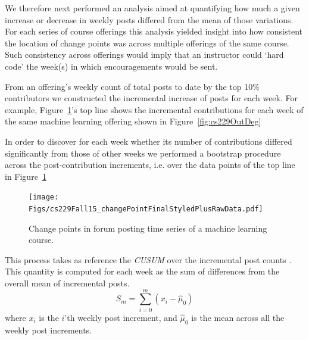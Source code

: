 We therefore next performed an analysis aimed at quantifying how much
a given increase or decrease in weekly posts differed from the mean of
those variations. For each series of course offerings this analysis
yielded insight into how consistent the location of change points was
across multiple offerings of the same course. Such consistency across
offerings would imply that an instructor could `hard code' the week(s)
in which encouragements would be sent.

From an offering's weekly count of total posts to date by the top 10\%
contributors we constructed the incremental increase of posts for each
week. For example, Figure~\ref{fig:cs229ChangePts}'s top line shows
the incremental contributions for each week of the same machine
learning offering shown in Figure~\ref{fig:cs229OutDeg}

In order to discover for each week whether its number of contributions
differed significantly from those of other weeks we performed a
bootstrap procedure across the post-contribution increments, i.e. over
the data points of the top line in Figure~\ref{fig:cs229ChangePts}
\cite{tayl16}
\begin{figure}[htp]
       \centering
       \texttt{[image: Figs/cs229Fall15\_changePointFinalStyledPlusRawData.pdf]}
       \caption{\textnormal{Change points in forum posting 
           time series of a machine learning course.}}
       \label{fig:cs229ChangePts}
\end{figure}
This process takes as reference the {\em CUSUM} over the incremental
post counts \cite{nist2012}. This quantity is computed for each week
as the sum of differences from the overall mean of incremental posts.
\begin{equation}
S_m = \sum_{i=0}^{m}(x_i-\hat{\mu}_0)
\end{equation}
where $x_i$ is the $i$'th weekly post increment, and $\hat{\mu}_0$ is
the mean across all the weekly post increments.

